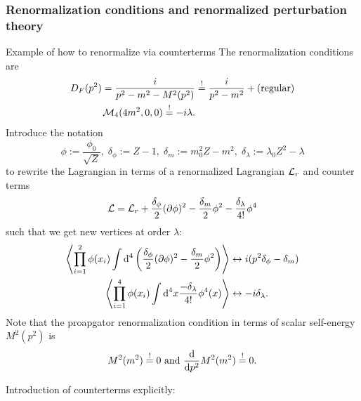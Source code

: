 \subsubsection{Renormalization conditions and renormalized perturbation theory}

\begin{mybox}{Example of how to renormalize via counterterms}
The renormalization conditions are
\begin{align}
	D_F(p^2) = \frac{i}{p^2-m^2-M^2(p^2)} &\stackrel{!}{=} \frac{i}{p^2-m^2} + (\text{regular})\\
	\mathcal{M}_4(4m^2,0,0) \stackrel{!}{=} -i\lambda.
\end{align}
Introduce the notation
\begin{equation}
	\phi := \frac{\phi_0}{\sqrt{Z}},\; \delta_\phi:= Z-1,\; \delta_m:= m^2_0 Z-m^2,\; \delta_\lambda:= \lambda_0 Z^2-\lambda
\end{equation}
to rewrite the Lagrangian in terms of a renormalized Lagrangian $\mathcal{L}_r$ and counter terms
\begin{equation}
\mathcal{L} = \mathcal{L}_r+\frac{\delta_\phi}{2} (\partial \phi)^2 - \frac{\delta_m}{2} \phi^2 - \frac{\delta_\lambda}{4!} \phi^4
\end{equation}
such that we get new vertices at order $\lambda$:
\begin{align}
	\expval{ \prod_{i=1}^{2}\phi(x_i) \int \mathrm{d}^4  \left(\frac{\delta_\phi}{2} (\partial \phi)^2 - \frac{\delta_m}{2} \phi^2\right)} &\leftrightarrow i(p^2\delta_\phi -\delta_m) \\
	\expval{ \prod_{i=1}^4 \phi(x_i) \int \mathrm{d}^4x \frac{-\delta_\lambda}{4!}\phi^4 (x) } &\leftrightarrow -i \delta_{\lambda}.
\end{align}
Note that the proapgator renormalization condition in terms of scalar self-energy $M^2(p^2)$ is
\begin{equation}
	M^2(m^2) \stackrel{!}{=}0 \text{  and  } \frac{\mathrm{d}}{\mathrm{d} p^2}M^2(m^2) \stackrel{!}{=}0.
\end{equation}
\end{mybox}
Introduction of counterterms explicitly:
